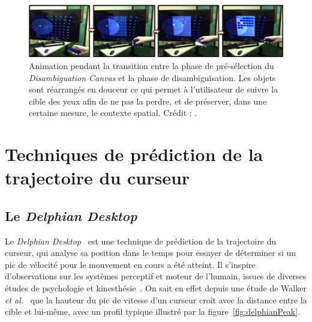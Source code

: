 \begin{appendices}
	
	
	
	\begin{figure}[!htbp]
		\centering
		\includegraphics[width=\textwidth]{figures/ch2/dCanvasContext}
		\caption[\emph{Disambiguation Canvas} -- animation de transition]{Animation pendant la transition entre la phase de pré-sélection du \emph{Disambiguation Canvas} et la phase de disambiguïsation. Les objets sont réarrangés \og en douceur \fg{} ce qui permet à l'utilisateur de suivre la cible des yeux afin de ne pas la perdre, et de préserver, dans une certaine mesure, le contexte spatial. Crédit : \cite{debarba2013disambiguation}.}
		\label{fig:dCanvasContext}
	\end{figure}












\FloatBarrier
\section{Techniques de prédiction de la trajectoire du curseur}

	\subsection{Le \emph{Delphian Desktop}}
	\label{sub:delphian}
	Le \emph{Delphian Desktop}~\cite{asano2005predictive} est une technique de prédiction de la trajectoire du curseur, qui analyse sa position dans le temps pour essayer de déterminer si un pic de vélocité pour le mouvement en cours a été atteint. Il s'inspire d'observations sur les systèmes perceptif et moteur de l'humain, issues de diverses études de psychologie et kinesthésie~\cite{accot2003refining, graham1995pointing, graham1996physical, mackenzie1992extending, mackenzie1994prediction, takagi2002fundamental, walker1993spatial}. On sait en effet depuis une étude de Walker \emph{et al.}~\cite{walker1993spatial} que la hauteur du pic de vitesse d'un curseur croît avec la distance entre la cible et lui-même, avec un profil typique illustré par la figure~\ref{fig:delphianPeak}.


\end{appendices}
